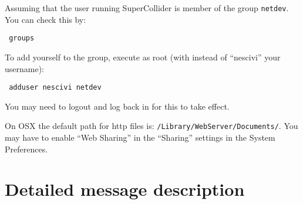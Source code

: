 \documentclass[letterpaper,10pt]{article}
\begin{document}
Assuming that the user running SuperCollider is member of the group \verb|netdev|. You can check this by:

\begin{verbatim}
 groups
\end{verbatim}

To add yourself to the group, execute as root (with instead of ``nescivi'' your username):
\begin{verbatim}
 adduser nescivi netdev
\end{verbatim}

You may need to logout and log back in for this to take effect.

On OSX the default path for http files is: \verb|/Library/WebServer/Documents/|. You may have to enable ``Web Sharing'' in the ``Sharing'' settings in the System Preferences.



\section{Detailed message description}
\end{document}
